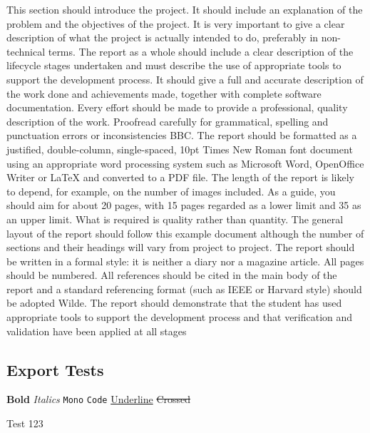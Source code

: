 \documentclass[twocolumn]{article}
\begin{document}
This section should introduce the project.
It should include an explanation of the problem and the objectives of the project.
It is very important to give a clear description of what the project is actually intended to do, preferably in non-technical terms.
The report as a whole should include a clear description of the lifecycle stages undertaken and must describe the use of appropriate tools to support the development process.
It should give a full and accurate description of the work done and achievements made, together with complete software documentation.
Every effort should be made to provide a professional, quality description of the work.
Proofread carefully for grammatical, spelling and punctuation errors or inconsistencies BBC.
The report should be formatted as a justified, double-column, single-spaced, 10pt Times New Roman font document using an appropriate word processing system such as Microsoft Word, OpenOffice Writer or \LaTeX{} and converted to a PDF file.
The length of the report is likely to depend, for example, on the number of images included.
As a guide, you should aim for about 20 pages, with 15 pages regarded as a lower limit and 35 as an upper limit.
What is required is quality rather than quantity.
The general layout of the report should follow this example document although the number of sections and their headings will vary from project to project.
The report should be written in a formal style: it is neither a diary nor a magazine article.
All pages should be numbered.
All references should be cited in the main body of the report and a standard referencing format (such as IEEE or Harvard style) should be adopted Wilde.
The report should demonstrate that the student has used appropriate tools to support the development process and that verification and validation have been applied at all stages

\subsection{Export Tests}
\label{sec:org40777bf}

\textbf{Bold}
\emph{Italics}
\texttt{Mono}
\texttt{Code}
\uline{Underline}
\sout{Crossed}

Test 123
\end{document}
